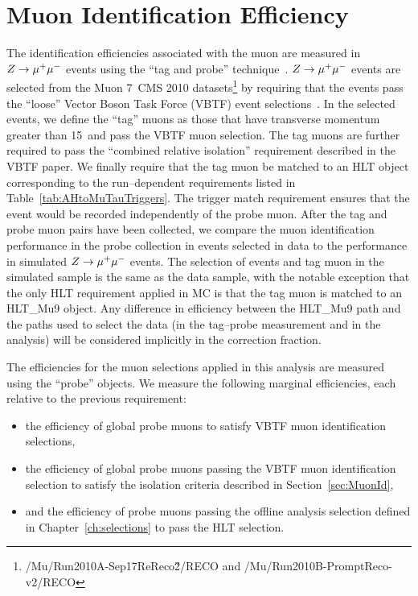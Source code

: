 \section{Muon Identification Efficiency} \label{sec:ZmumuTagAndProbe} 
%
The identification efficiencies associated with the muon are measured in $\mbox{\ensuremath{Z\to\mu^+\mu^-}}$
events using the ``tag and probe'' technique~\cite{CMS-PAS-EWK-10-002}.  $\mbox{\ensuremath{Z\to\mu^+\mu^-}}$
events are selected from the Muon 7~\TeV CMS 2010
datasets\footnote{\mbox{/Mu/Run2010A-Sep17ReReco\v2/RECO} and
\mbox{/Mu/Run2010B-PromptReco-v2/RECO} } by requiring that the events pass the
``loose'' Vector Boson Task Force (VBTF) event
selections~\cite{CMS-PAS-EWK-10-002}.  In the selected events, we define the
``tag'' muons as those that have transverse momentum greater than 15~\GeVc and
pass the VBTF muon selection.  The tag muons are further required to pass the
``combined relative isolation'' requirement described in the VBTF paper.  We finally require
that the tag muon be matched to an HLT object corresponding to the
run--dependent requirements listed in Table~\ref{tab:AHtoMuTauTriggers}.  The
trigger match requirement ensures that the event would be recorded independently
of the probe muon.  After the tag and probe muon pairs have been collected, we
compare the muon identification performance in the probe collection in events
selected in data to the performance in simulated $\mbox{\ensuremath{Z\to\mu^+\mu^-}}$ events.  The selection
of events and tag muon in the simulated sample is the same as the data sample,
with the notable exception that the only HLT requirement applied in MC is that
the tag muon is matched to an HLT\_Mu9 object.  Any difference in efficiency
between the HLT\_Mu9 path and the paths used to select the data (in the
tag--probe measurement and in the analysis) will be considered implicitly in the
correction fraction. 

The efficiencies for the muon selections applied in this analysis are measured
using the ``probe'' objects.  We measure the following marginal efficiencies,
each relative to the previous requirement:
\begin{itemize}
\item the efficiency of global probe muons to satisfy VBTF muon identification
selections,
\item the efficiency of global probe muons passing the VBTF muon identification
selection to satisfy the isolation criteria described in
Section~\ref{sec:MuonId},
\item and the efficiency of probe muons passing the offline analysis selection defined
  in Chapter~\ref{ch:selections} to pass the HLT selection.
\end{itemize}

